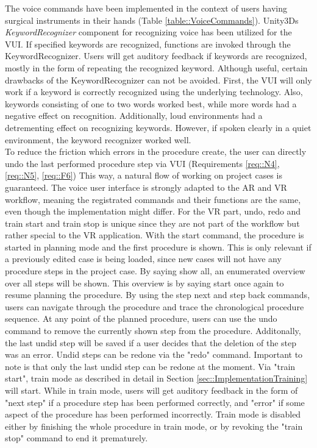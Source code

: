The voice commands have been implemented in the context of users having surgical instruments in their hands (Table \ref{table::VoiceCommands}).
Unity3Ds \textit{KeywordRecognizer} component for recognizing voice has been utilized for the VUI.
If specified keywords are recognized, functions are invoked through the KeywordRecognizer.
Users will get auditory feedback if keywords are recognized, mostly in the form of repeating the recognized keyword.
Although useful, certain drawbacks of the KeywordRecognizer can not be avoided.
First, the VUI will only work if a keyword is correctly recognized using the underlying technology.
Also, keywords consisting of one to two words worked best, while more words had a negative effect on recognition.
Additionally, loud environments had a detrementing effect on recognizing keywords.
However, if spoken clearly in a quiet environment, the keyword recognizer worked well.
\\ To reduce the friction which errors in the procedure create, the user can directly undo the last performed procedure step via VUI (Requirements \ref{req::N4}, \ref{req::N5}, \ref{req::F6})
This way, a natural flow of working on project cases is guaranteed.
The voice user interface is strongly adapted to the AR and VR workflow, meaning the registrated commands and their functions are the same, even though the implementation might differ.
For the VR part, undo, redo and train start and train stop is unique since they are not part of the workflow but rather special to the VR application.
With the start command, the procedure is started in planning mode and the first procedure is shown.
This is only relevant if a previously edited case is being loaded, since new cases will not have any procedure steps in the project case.
By saying show all, an enumerated overview over all steps will be shown. This overview is by saying start once again to resume planning the procedure.
By using the step next and step back commands, users can navigate through the procedure and trace the chronological procedure sequence.
At any point of the planned procedure, users can use the undo command to remove the currently shown step from the procedure.
Additonally, the last undid step will be saved if a user decides that the deletion of the step was an error.
Undid steps can be redone via the "redo" command.
Important to note is that only the last undid step can be redone at the moment.
Via "train start", train mode as described in detail in Section \ref{sec::ImplementationTraining} will start.
While in train mode, users will get auditory feedback in the form of "next step" if a procedure step has been performed correctly, and "error" if some aspect of the procedure has been performed incorrectly.
Train mode is disabled either by finishing the whole procedure in train mode, or by revoking the "train stop" command to end it prematurely.
